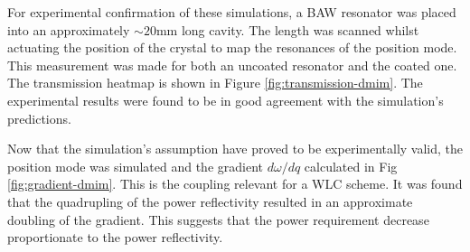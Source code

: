 \documentclass[aps,  
                a4paper, 
                amsmath, 
                amssymb, 
                preprint,
                tightenlines,  
                amsfonts,
                nofootinbib,
                onecolumn,
                titlepage,
                10pt
            ]{revtex4-2}
\begin{document}
    \par
    For experimental confirmation of these simulations, a BAW resonator was placed into an approximately $\sim20$mm long cavity. The length was scanned whilst actuating the position of the crystal to map the resonances of the position mode. This measurement was made for both an uncoated resonator and the coated one. The transmission heatmap is shown in Figure \ref{fig:transmission-dmim}. The experimental results were found to be in good agreement with the simulation's predictions.
    \par
    Now that the simulation's assumption have proved to be experimentally valid, the position mode was simulated and the gradient $d\omega/dq$ calculated in Fig \ref{fig:gradient-dmim}. This is the coupling relevant for a WLC scheme. It was found that the quadrupling of the power reflectivity resulted in an approximate doubling of the gradient. This suggests that the power requirement decrease proportionate to the power reflectivity. 
\end{document}

